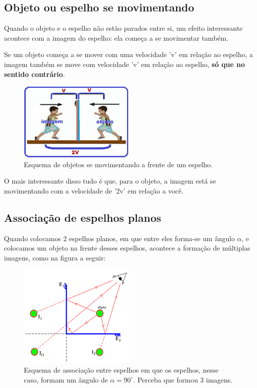 \documentclass[12pt]{extarticle}
\newcommand{\<}{\langle}
\renewcommand{\>}{\rangle}
\theoremstyle{definition}
\begin{document}
\subsection{Objeto ou espelho se movimentando}
Quando o objeto e o espelho não estão parados entre si, um efeito interessante acontece com a imagem do espelho: ela começa a se movimentar também.

Se um objeto começa a se mover com uma velocidade 'v' em relação ao espelho, a imagem também se move com velocidade 'v' em relação ao espelho, \textbf{só que no sentido contrário}.

\begin{figure}[H]
    \centering
    \includegraphics[width=0.5\textwidth]{objeto se movimentando.png}
    \caption{Esquema de objetos se movimentando a frente de um espelho.}
    \label{fig:mov_espelho}
\end{figure}

O mais interessante disso tudo é que, para o objeto, a imagem está se movimentando com a velocidade de '2v' em relação a você. 

\subsection{Associação de espelhos planos}

Quando colocamos 2 espelhos planos, em que entre eles forma-se um ângulo $\alpha$, e colocamos um objeto na frente desses espelhos, acontece a formação de múltiplas imagens, como na figura a seguir:
\begin{figure}[H]
    \centering
    \includegraphics[width=0.5\textwidth]{associacao.jpg}
    \caption{Esquema de associação entre espelhos em que os espelhos, nesse caso, formam um ângulo de $\alpha=90^\circ$. Perceba que formou 3 imagens.}
    \label{fig:associacao}
\end{figure}
\end{document}

